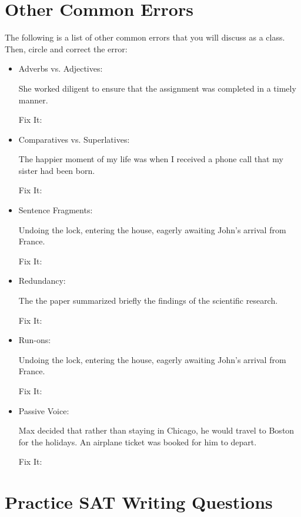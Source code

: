 \section{Other Common Errors}

The following is a list of other common errors that you will discuss as a class. Then, circle and correct the error:
\begin{itemize}
 \item{Adverbs vs. Adjectives:} \hrulefill

  She worked diligent to ensure that the assignment was completed in a timely manner. 

  Fix It: \hrulefill
  
\item{Comparatives vs. Superlatives:} \hrulefill

The happier moment of my life was when I received a phone call that my sister had been born.

Fix It: \hrulefill

\item{Sentence Fragments:} \hrulefill

Undoing the lock, entering the house, eagerly awaiting John's arrival from France. 

Fix It: \hrulefill

\item{Redundancy:} \hrulefill

The the paper summarized briefly the findings of the scientific research. 

Fix It: \hrulefill

\item{Run-ons:} \hrulefill

Undoing the lock, entering the house, eagerly awaiting John's arrival from France. 

Fix It: \hrulefill

\item{Passive Voice: } \hrulefill

Max decided that rather than staying in Chicago, he would travel to Boston for the holidays. An airplane ticket was booked for him to depart. 

Fix It: \hrulefill

\end{itemize} 

\section{Practice SAT Writing Questions}

